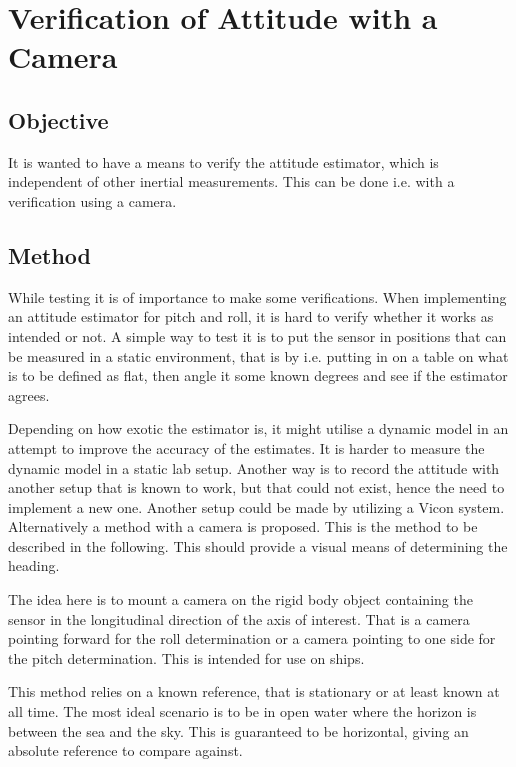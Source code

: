 \chapter{Verification of Attitude with a Camera}

\section{Objective}
It is wanted to have a means to verify the attitude estimator, which is independent
of other inertial measurements. This can be done i.e. with a verification using a camera.

\section{Method}
While testing it is of importance to make some verifications. When
implementing an attitude estimator for pitch and roll, it is hard to
verify whether it works as intended or not. A simple way to test it is
to put the sensor in positions that can be measured in a static
environment, that is by i.e. putting in on a table on what is to be
defined as flat, then angle it some known degrees and see if the
estimator agrees.

Depending on how exotic the estimator is, it might utilise a dynamic
model in an attempt to improve the accuracy of the estimates. It is
harder to measure the dynamic model in a static lab setup. Another way is to record
the attitude with another setup that is known to work, but that could
not exist, hence the need to implement a new one. Another setup could be made by utilizing a Vicon system. Alternatively a
method with a camera is proposed. This is the method to be described
in the following. This should provide a visual means of determining
the heading.

The idea here is to mount a camera on the rigid body object containing
the sensor in the longitudinal direction of the axis of interest. That
is a camera pointing forward for the roll determination or a camera
pointing to one side for the pitch determination. This is intended for
use on ships.

This method relies on a known reference, that is stationary or at least
known at all time. The most ideal scenario is to be in open water
where the horizon is between the sea and the sky. This is guaranteed
to be horizontal, giving an absolute reference to compare against.

